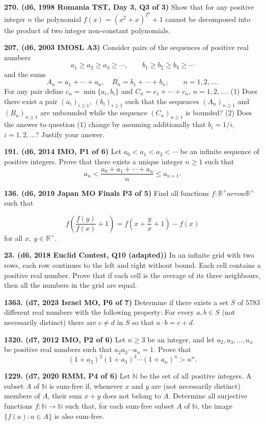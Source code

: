 \documentclass{article}
\begin{document}
\textbf{270. (\color{red}d6\color{black}, 1998 Romania TST, Day 3, Q3 of 3)} Show that for any positive integer $n$ the polynomial $f(x)=(x^2+x)^{2^n}+1$ cannot be decomposed into the product of two integer non-constant polynomials.

\textbf{207. (\color{red}d6\color{black}, 2003 IMOSL A3)} Consider pairs of the sequences of positive real numbers \[a_1\geq a_2\geq a_3\geq\cdots,\qquad b_1\geq b_2\geq b_3\geq\cdots\] and the sums \[A_n = a_1 + \cdots + a_n,\quad B_n = b_1 + \cdots + b_n;\qquad n = 1,2,\ldots.\] For any pair define $c_n = \min\{a_i,b_i\}$ and $C_n = c_1 + \cdots + c_n$, $n=1,2,\ldots$.
(1) Does there exist a pair $(a_i)_{i\geq 1}$, $(b_i)_{i\geq 1}$ such that the sequences $(A_n)_{n\geq 1}$ and $(B_n)_{n\geq 1}$ are unbounded while the sequence $(C_n)_{n\geq 1}$ is bounded?
(2) Does the answer to question (1) change by assuming additionally that $b_i = 1/i$, $i=1,2,\ldots$?
Justify your answer.

\textbf{191. (\color{red}d6\color{black}, 2014 IMO, P1 of 6)} Let \(a_0 < a_1 < a_2 < \cdots\) be an infinite sequence of positive integers. Prove that there exists a unique integer \(n \geq 1\) such that \[a_n < \frac{a_0 + a_1 + \cdots + a_n}{n} \leq a_{n+1}.\]

\textbf{136. (\color{red}d6\color{black}, 2019 Japan MO Finals P3 of 5)} Find all functions $f:\mathbb R^{+} arrow \mathbb R^{+}$ such that

$$f(\frac{f(y)}{f(x)}+1)=f(x+\frac{y}{x}+1)-f(x)$$
for all $x,\ y\in\mathbb{R^{+}}$.

\textbf{23. (\color{red}d6\color{black}, 2018 Euclid Contest, Q10 (adapted))} In an infinite grid with two rows, each row continues to the left and right without bound. Each cell contains a positive real number. Prove that if each cell is the average of its three neighbours, then all the numbers in the grid are equal.

\textbf{1363. (\color{red}d7\color{black}, 2023 Israel MO, P6 of 7)} Determine if there exists a set $S$ of $5783$ different real numbers with the following property:
For every $a,b\in S$ (not necessarily distinct) there are $c\neq d$ in $S$ so that $a\cdot b=c+d$.

\textbf{1320. (\color{red}d7\color{black}, 2012 IMO, P2 of 6)} Let $n\ge 3$ be an integer, and let $a_2,a_3,\ldots ,a_n$ be positive real numbers such that $a_{2}a_{3}\cdots a_{n}=1$. Prove that
\[(1 + a_2)^2 (1 + a_3)^3 \dotsm (1 + a_n)^n > n^n.\]

\textbf{1229. (\color{red}d7\color{black}, 2020 RMM, P4 of 6)} Let $\mathbb N$ be the set of all positive integers. A subset $A$ of $\mathbb N$ is sum-free if, whenever $x$ and $y$ are (not necessarily distinct) members of $A$, their sum $x+y$ does not belong to $A$. Determine all surjective functions $f:\mathbb N\to\mathbb N$ such that, for each sum-free subset $A$ of $\mathbb N$, the image $\{f(a):a\in A\}$ is also sum-free.
\end{document}
